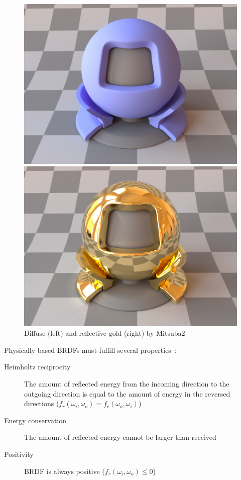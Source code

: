\begin{figure}[H]
	\centering
	\begin{minipage}{.5\textwidth}
		\centering
		\includegraphics[width=.9\linewidth]{img/bsdf_diffuse.jpg}
	\end{minipage}%
	\begin{minipage}{.5\textwidth}
		\centering
		\includegraphics[width=.9\linewidth]{img/bsdf_reflective.jpg}
	\end{minipage}
\caption{Diffuse (left) and reflective gold (right) by Mitsuba2~\cite{mitsubaWeb}}
\label{fig:diffuse_reflective}
\end{figure}

Physically based BRDFs must fulfill several properties~\citealp{duvenhage2013numerical}:
\begin{description}
	\item[Heimholtz reciprocity] The amount of reflected energy from the incoming direction to the outgoing direction is equal to the amount of energy in the reversed directions ($f_r(\omega_i,\omega_o)=f_r(\omega_o,\omega_i)$)
	\item[Energy conservation] The amount of reflected energy cannot be larger than received
	\item[Positivity] BRDF is always positive ($f_r(\omega_i,\omega_o)\le0$)
\end{description}

